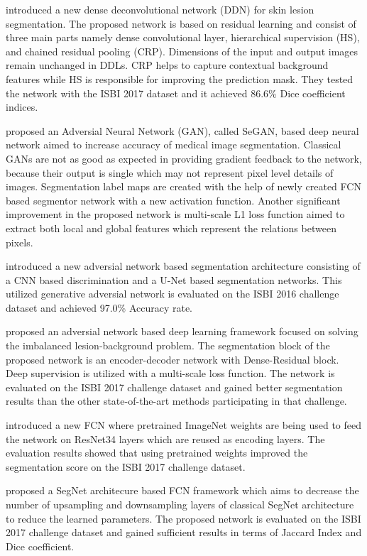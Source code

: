     \citet{li2018dense} introduced a new dense deconvolutional network (DDN) for skin lesion segmentation.
    The proposed network is based on residual learning and consist of three main parts namely dense convolutional layer, hierarchical supervision (HS), and chained residual pooling (CRP).
    Dimensions of the input and output images remain unchanged in DDLs.
    CRP helps to capture contextual background features while HS is responsible for improving the prediction mask.
    They tested the network with the ISBI 2017 dataset and it achieved 86.6\% Dice coefficient indices.

    \citet{xue2018adversarial} proposed an Adversial Neural Network (GAN), called SeGAN, based deep neural network aimed to increase accuracy of medical image segmentation.
    Classical GANs are not as good as expected in providing gradient feedback to the network, because their output is single which may not represent pixel level details of images.
    Segmentation label maps are created with the help of newly created FCN based segmentor network with a new activation function.
    Another significant improvement in the proposed network is multi-scale L1 loss function aimed to extract both local and global features which represent the relations between pixels.

    \citet{peng2019segmentation} introduced a new adversial network based segmentation architecture consisting of a CNN based discrimination and a U-Net based segmentation networks.
    This utilized generative adversial network is evaluated on the ISBI 2016 challenge dataset and achieved 97.0\% Accuracy rate.

    \citet{tu2019segmentation} proposed an adversial network based deep learning framework focused on solving the imbalanced lesion-background problem.
    The segmentation block of the proposed network is an encoder-decoder network with Dense-Residual block. Deep supervision is utilized with a multi-scale loss function.
    The network is evaluated on the ISBI 2017 challenge dataset and gained better segmentation results than the other state-of-the-art methods participating in that challenge.

    \citet{tschandl2019domain} introduced a new FCN where pretrained ImageNet weights are being used to feed the network on ResNet34 layers which are reused as encoding layers.
    The evaluation results showed that using pretrained weights improved the segmentation score on the ISBI 2017 challenge dataset.

    \citet{ninh2019skin} proposed a SegNet architecure based FCN framework
    which aims to decrease the number of upsampling and downsampling layers of classical SegNet architecture to reduce the learned parameters.
    The proposed network is evaluated on the ISBI 2017 challenge dataset and gained sufficient results in terms of Jaccard Index and Dice coefficient.

